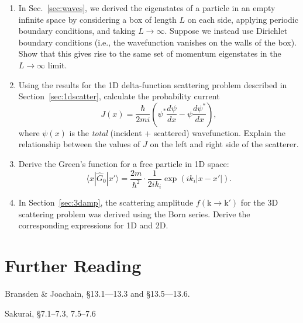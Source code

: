 \documentclass[pra,12pt]{revtex4}
\begin{document}
\begin{enumerate}
\item In Sec.~\ref{sec:waves}, we derived the eigenstates of a
  particle in an empty infinite space by considering a box of length
  $L$ on each side, applying periodic boundary conditions, and taking
  $L \rightarrow \infty$.  Suppose we instead use Dirichlet boundary
  conditions (i.e., the wavefunction vanishes on the walls of the
  box).  Show that this gives rise to the same set of momentum
  eigenstates in the $L \rightarrow \infty$ limit.

\item Using the results for the 1D delta-function scattering problem
  described in Section~\ref{sec:1dscatter}, calculate the probability
  current
  \begin{equation}
    J(x) = \frac{\hbar}{2mi}\left(\psi^*\frac{d\psi}{dx} - \psi\frac{d\psi^*}{dx}\right),
  \end{equation}
  where $\psi(x)$ is the \textit{total} (incident + scattered)
  wavefunction.  Explain the relationship between the values of $J$ on
  the left and right side of the scatterer.

\item Derive the Green's function for a free particle in 1D space:
  \begin{equation}
    \langle x|\hat{G}_0|x'\rangle = \frac{2m}{\hbar^2} \cdot \frac{1}{2ik_i} \exp\left(ik_i|x-x'|\right).
  \end{equation}

\item In Section~\ref{sec:3damp}, the scattering amplitude
  $f(\mathrm{k}\rightarrow\mathrm{k}')$ for the 3D scattering problem
  was derived using the Born series.  Derive the corresponding
  expressions for 1D and 2D.
\end{enumerate}

\section*{Further Reading}

\begin{enumerate}[[1{]}]
\item Bransden \& Joachain, \S13.1---13.3 and \S13.5---13.6.
\item Sakurai, \S7.1--7.3, 7.5--7.6
\end{enumerate}
\end{document}
